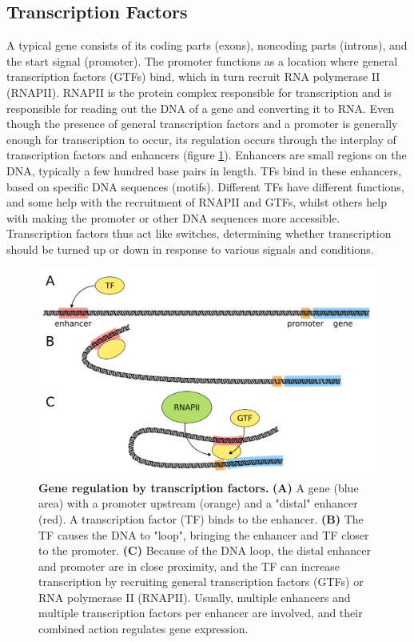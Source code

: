\subsection{Transcription Factors}

A typical gene consists of its coding parts (exons), noncoding parts (introns), and the start signal (promoter). The promoter functions as a location where general transcription factors (GTFs) bind, which in turn recruit RNA polymerase II (RNAPII). RNAPII is the protein complex responsible for transcription and is responsible for reading out the DNA of a gene and converting it to RNA. Even though the presence of general transcription factors and a promoter is generally enough for transcription to occur\cite{Haberle2018}, its regulation occurs through the interplay of transcription factors and enhancers (figure \ref{fig:TF}). Enhancers are small regions on the DNA, typically a few hundred base pairs in length. TFs bind in these enhancers, based on specific DNA sequences (motifs). Different TFs have different functions, and some help with the recruitment of RNAPII and GTFs, whilst others help with making the promoter or other DNA sequences more accessible. Transcription factors thus act like switches, determining whether transcription should be turned up or down in response to various signals and conditions.

\begin{figure}[h]
    \center
    \includegraphics[width=0.8\linewidth]{ch.introduction/imgs/transcription_factor.png}
    \caption{\textbf{Gene regulation by transcription factors.} \textbf{(A)} A gene (blue area) with a promoter upstream (orange) and a "distal" enhancer (red). A transcription factor (TF) binds to the enhancer. \textbf{(B)} The TF causes the DNA to "loop", bringing the enhancer and TF closer to the promoter. \textbf{(C)} Because of the DNA loop, the distal enhancer and promoter are in close proximity, and the TF can increase transcription by recruiting general transcription factors (GTFs) or RNA polymerase II (RNAPII). Usually, multiple enhancers and multiple transcription factors per enhancer are involved, and their combined action regulates gene expression.}
    \label{fig:TF}
\end{figure}

